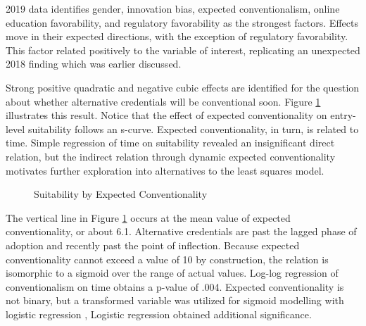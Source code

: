 \documentclass[AER]{./aea-latex-templates/AEA}
\begin{document}
2019 data identifies gender, innovation bias, expected
conventionalism, online education favorability, and regulatory
favorability as the strongest factors. Effects move in their expected directions,
with the exception of regulatory favorability.
This factor related positively to the variable of interest, replicating an unexpected 2018 finding which was earlier discussed.

Strong positive quadratic and negative cubic effects are identified for
the question about whether alternative credentials will be conventional soon.
Figure \ref{fig:expect_convention_voi} illustrates this result. Notice that the effect of expected conventionality on entry-level suitability follows an s-curve.
Expected conventionality, in turn, is related to time.
Simple regression of time on suitability revealed an insignificant direct relation,
but the indirect relation through dynamic expected conventionality motivates further exploration into alternatives to the least squares model.

\begin{figure}[h!]
    \centering
    \caption{Suitability by Expected Conventionality}
    

    \label{fig:expect_convention_voi}
    \end{figure}

The vertical line in Figure \ref{fig:expect_convention_voi} occurs at the mean value of expected conventionality, or about 6.1.
Alternative credentials are past the lagged phase of adoption and recently past the
point of inflection. Because expected conventionality cannot exceed a value of 10 by
construction, the relation is isomorphic to a sigmoid over the range of actual values.
Log-log regression of conventionalism on time obtains a p-value of .004.
Expected conventionality is not binary,
but a transformed variable was utilized for sigmoid modelling with logistic regression \cite{cox2008stata},
Logistic regression obtained additional significance.
\end{document}
